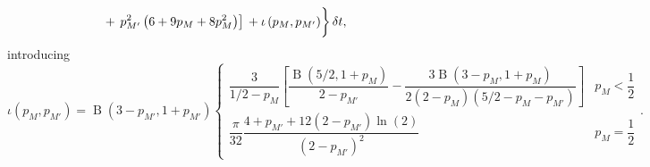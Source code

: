 \documentclass[useAMS,usedcolumn,usegraphicx,usenatbib]{mn2e}
\DeclareMathOperator{\Beta}{B}
\newcommand{\recip}[1]{\ensuremath{\dfrac{1}{#1}}}
\begin{document}
\begin{onecolumn}
\begin{align}
 {} + & \left. \left. p_{M'}^2\left(6 + 9p_M + 8p_M^2\right)\right]  \vphantom{\recip{210}} + \iota \left(p_M,p_{M'}\right) \right\} \delta t,
\end{align}
introducing
\begin{equation}
\iota\left(p_M,p_{M'}\right) = \Beta\left(3-p_{M'},1+p_{M'}\right) \begin{cases} \dfrac{3}{1/2 - p_M}\left[\dfrac{\Beta\left(5/2,1+p_M\right)}{2-p_{M'}} - \dfrac{3\Beta\left(3-p_M,1+p_M\right)}{2\left(2-p_M\right)\left(5/2 - p_M - p_{M'}\right)}\right] & p_M < \recip{2} \\
\dfrac{\pi}{32}\dfrac{4 + p_{M'} + 12 \left(2 - p_{M'}\right) \ln(2)}{\left(2-p_{M'}\right)^2} & p_M = \recip{2} \end{cases}.
\end{equation}


\end{onecolumn}
\end{document}
